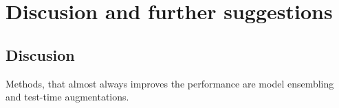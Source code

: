 \chapter{Discusion and further suggestions}
\section{Discusion}




Methods, that almost always improves the performance are model ensembling and test-time augmentations.